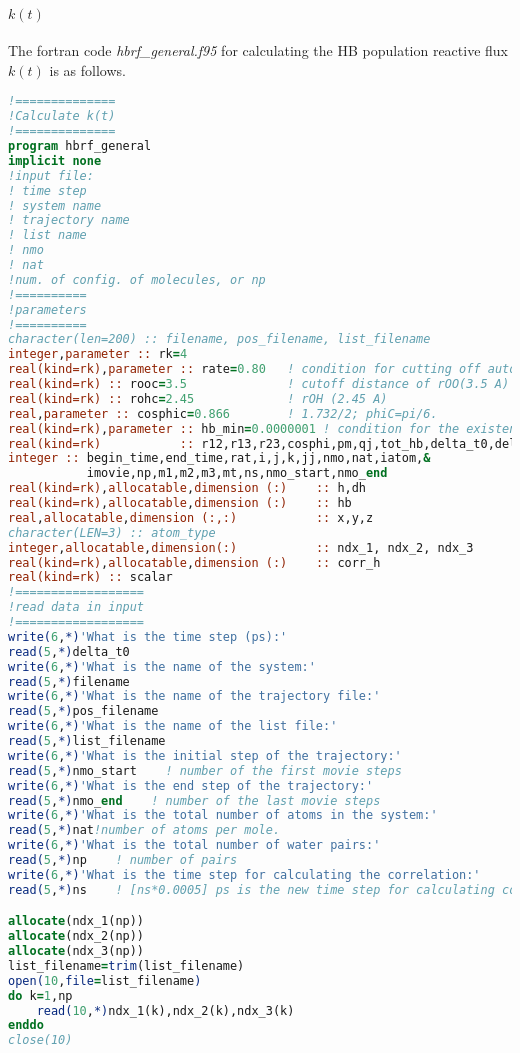 \paragraph{$k(t)$}      
The fortran code \emph{hbrf\_general.f95} for calculating the HB population reactive flux $k(t)$ is as follows.
\begin{lstlisting}[language=fortran]
!==============
!Calculate k(t)
!==============
program hbrf_general
implicit none
!input file:
! time step
! system name
! trajectory name
! list name
! nmo
! nat
!num. of config. of molecules, or np
!==========
!parameters
!==========
character(len=200) :: filename, pos_filename, list_filename
integer,parameter :: rk=4
real(kind=rk),parameter :: rate=0.80   ! condition for cutting off auto-correlation functions
real(kind=rk) :: rooc=3.5              ! cutoff distance of rOO(3.5 A)
real(kind=rk) :: rohc=2.45             ! rOH (2.45 A)
real,parameter :: cosphic=0.866        ! 1.732/2; phiC=pi/6.
real(kind=rk),parameter :: hb_min=0.0000001 ! condition for the existence of h-bond
real(kind=rk)           :: r12,r13,r23,cosphi,pm,qj,tot_hb,delta_t0,delta_t
integer :: begin_time,end_time,rat,i,j,k,jj,nmo,nat,iatom,&
           imovie,np,m1,m2,m3,mt,ns,nmo_start,nmo_end
real(kind=rk),allocatable,dimension (:)    :: h,dh
real(kind=rk),allocatable,dimension (:)    :: hb
real,allocatable,dimension (:,:)           :: x,y,z
character(LEN=3) :: atom_type  
integer,allocatable,dimension(:)           :: ndx_1, ndx_2, ndx_3
real(kind=rk),allocatable,dimension (:)    :: corr_h
real(kind=rk) :: scalar
!==================
!read data in input
!==================
write(6,*)'What is the time step (ps):'
read(5,*)delta_t0
write(6,*)'What is the name of the system:'
read(5,*)filename
write(6,*)'What is the name of the trajectory file:'
read(5,*)pos_filename
write(6,*)'What is the name of the list file:'
read(5,*)list_filename
write(6,*)'What is the initial step of the trajectory:'
read(5,*)nmo_start    ! number of the first movie steps
write(6,*)'What is the end step of the trajectory:'
read(5,*)nmo_end    ! number of the last movie steps
write(6,*)'What is the total number of atoms in the system:'
read(5,*)nat!number of atoms per mole.
write(6,*)'What is the total number of water pairs:'
read(5,*)np    ! number of pairs
write(6,*)'What is the time step for calculating the correlation:'
read(5,*)ns    ! [ns*0.0005] ps is the new time step for calculating correl,if delta_t0=0.0005 ps.

allocate(ndx_1(np))
allocate(ndx_2(np))
allocate(ndx_3(np))
list_filename=trim(list_filename)
open(10,file=list_filename)
do k=1,np
    read(10,*)ndx_1(k),ndx_2(k),ndx_3(k)
enddo
close(10)


\end{lstlisting}
